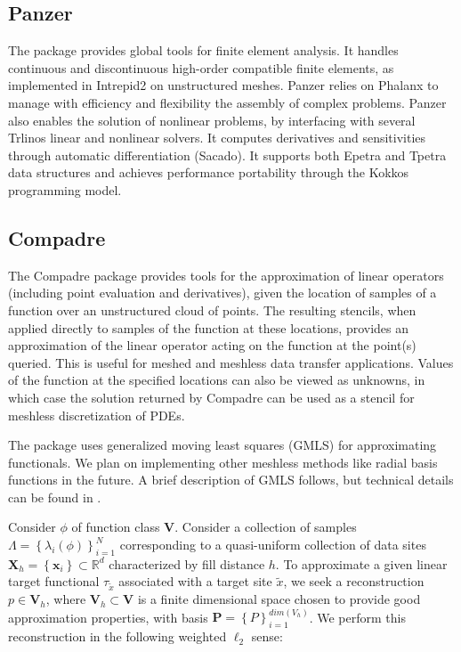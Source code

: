\subsection{Panzer}
The package provides global tools for finite element analysis. It handles continuous and discontinuous high-order compatible finite elements, as implemented in Intrepid2 on unstructured meshes. Panzer relies on Phalanx to manage with efficiency and flexibility the assembly of complex problems. Panzer also enables the solution of nonlinear problems, by interfacing with several Trlinos linear and nonlinear solvers. It computes derivatives and sensitivities through automatic differentiation (Sacado). It supports both Epetra and Tpetra data structures and achieves performance portability through the Kokkos programming model.

\subsection{Compadre}
The Compadre package provides tools for the approximation of linear operators (including point evaluation and derivatives), given the location of samples of a function over an unstructured cloud of points. The resulting stencils, when applied directly to samples of the function at these locations, provides an approximation of the linear operator acting on the function at the point(s) queried. This is useful for meshed and meshless data transfer applications. Values of the function at the specified locations can also be viewed as unknowns, in which case the solution returned by Compadre can be used as a stencil for meshless discretization of PDEs. 

The package uses generalized moving least squares (GMLS) for approximating functionals. We plan on implementing other meshless methods like radial basis functions in the future.  A brief description of GMLS follows, but technical details can be found in \cite{mirzaei2012generalized,wendland2004scattered}.

Consider $\phi$ of function class $\mathbf{V}$. Consider a collection of samples $\Lambda = \left\{\lambda_i(\phi)\right\}_{i=1}^{N}$ corresponding to a quasi-uniform\cite{wendland2004scattered} collection of data sites $\mathbf{X}_h = \left\{\mathbf{x}_i\right\} \subset \mathbb{R}^d$ characterized by fill distance $h$. To approximate a given linear target functional $\tau_{\tilde{x}}$ associated with a target site $\tilde{x}$, we seek a reconstruction $p \in \mathbf{V}_h$, where $\mathbf{V}_h \subset \mathbf{V}$ is a finite dimensional space chosen to provide good approximation properties, with basis $\mathbf{P}=\left\{P\right\}_{i=1}^{dim(V_h)}$. We perform this reconstruction in the following weighted $\ell_2$ sense:

